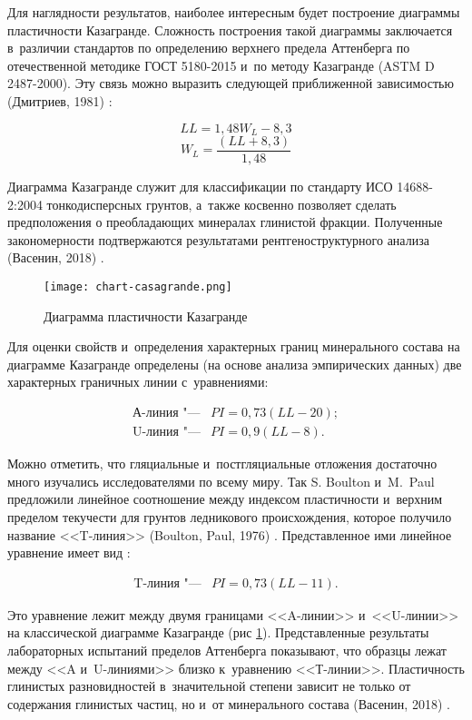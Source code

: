 Для наглядности результатов, наиболее интересным будет построение диаграммы пластичности Казагранде. Сложность построения такой диаграммы заключается в~различии  стандартов по определению верхнего предела Аттенберга по отечественной методике ГОСТ 5180-2015 и~по методу Казагранде (ASTM D 2487-2000). Эту связь можно выразить следующей приближенной зависимостью (Дмитриев, 1981) \cite{dmitriev1981}:

$$LL = 1,48W_L - 8,3$$
$$W_L = {\frac{(LL + 8,3)}{1,48}}$$

Диаграмма Казагранде служит для классификации по стандарту ИСО 14688-2:2004 тонкодисперсных грунтов, а~также косвенно позволяет сделать предположения о преобладающих минералах глинистой фракции. Полученные закономерности подтвержаются результатами рентгеноструктурного анализа (Васенин, 2018) \cite{vasenin2018}.


\begin{figure}[ht]
    \small
    \centering
    \texttt{[image: chart-casagrande.png]}
    \caption{Диаграмма пластичности Казагранде} \label{Fig:Caz}
  \end{figure}


Для оценки свойств и~определения характерных границ минерального состава на диаграмме Казагранде определены (на основе анализа эмпирических данных) две характерных граничных линии с~уравнениями:

\begin{align*}
    \text{А-линия "---} & PI = 0,73(LL - 20); \\
    \text{U-линия "---} & PI = 0,9(LL - 8).
\end{align*}

Можно отметить, что гляциальные и~постгляциальные отложения достаточно много изучались исследователями по всему миру. Так S. Boulton и~M.~Paul  предложили линейное соотношение между  индексом пластичности и~верхним пределом текучести  для грунтов ледникового происхождения, которое получило название <<T-линия>> (Boulton, Paul, 1976) \cite{boulton1976}. Представленное ими линейное уравнение имеет вид :

\begin{align*}
    \text{T-линия "---} & PI = 0,73(LL-11).
\end{align*}

Это уравнение лежит между двумя границами <<A-линии>> и~<<U-линии>> на классической диаграмме Казагранде (рис \ref{Fig:Caz}). Представленные результаты лабораторных испытаний пределов Аттенберга показывают, что образцы лежат между <<A и~U-линиями>> близко к~уравнению <<Т-линии>>. Пластичность глинистых разновидностей в~значительной степени зависит не только от содержания глинистых частиц, но и~от минерального состава (Васенин, 2018) \cite{vasenin2018}.


